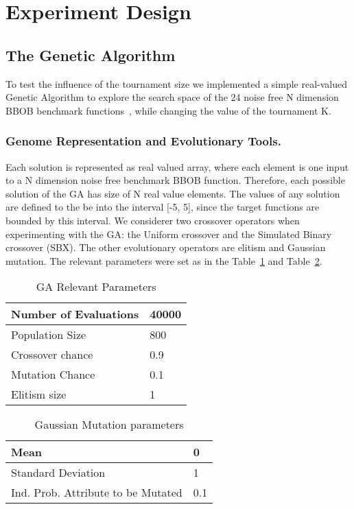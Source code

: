 \section{Experiment Design}

\subsection{The Genetic Algorithm}\label{sec:proposed:ga}

To test the influence of the tournament size we implemented a simple real-valued Genetic Algorithm to explore the search space of the 24 noise free N dimension BBOB benchmark functions~\cite{hansen2010real}, while changing the value of the tournament K.

\subsubsection*{Genome Representation and Evolutionary Tools.}
Each solution is represented as real valued array, where each element is one input to a N dimension noise free benchmark BBOB function. Therefore, each possible solution of the GA has size of N real value elements. The values of any solution are defined to the be into the interval [-5, 5], since the target functions are bounded by this interval. We considerer two crossover operators when experimenting with the GA: the Uniform crossover and the Simulated Binary crossover (SBX). The other evolutionary operators are elitism and Gaussian mutation. The relevant parameters were set as in the Table~\ref{relevant_par} and Table~\ref{gaussian_par}.

\vspace{3mm}
\begin{table}[!ht]
	\centering
	\begin{tabular}{|l|l|}
	\hline
	Number of Evaluations & 40000 \\ \hline
	Population Size &  800		\\ \hline
	Crossover chance 	& 0.9	\\ \hline
	Mutation Chance 	& 0.1	\\ \hline		
	Elitism size 		& 1		\\ \hline		
	\end{tabular}
	\caption{GA Relevant Parameters}
	\label{relevant_par}
\end{table}
	\vspace{-2mm}
%
\begin{table}[!ht]
	\centering
	\begin{tabular}{|l|l|}
	\hline
		Mean & 0 \\ \hline		
		Standard Deviation & 1 \\ \hline		
		Ind. Prob. Attribute to be Mutated &  0.1 \\ \hline		
	\end{tabular}
	\caption{Gaussian Mutation parameters}
	\label{gaussian_par}
\end{table}


